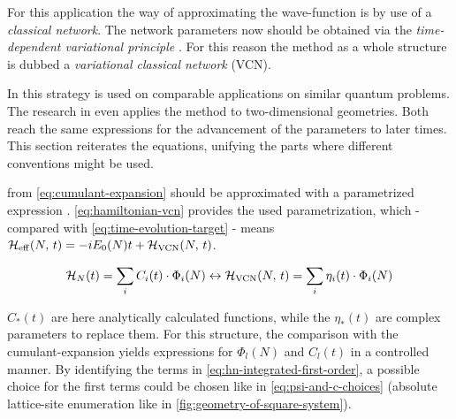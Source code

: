 For this application the way of approximating the wave-function is by use of a \emph{classical network}. 
The network parameters now should be obtained via the \emph{time-dependent variational principle} \cite{originalDerivationTimeDependendVariationalPrinciple}.
For this reason the method as a whole structure is dubbed a \emph{variational classical network} (VCN).

In \cite{variationalClassicalNetworksPaper} this strategy is used on comparable applications on similar quantum problems.
The research in \cite{probabilitySamplingRequirementVCN} even applies the method to two-dimensional geometries.
Both reach the same expressions for the advancement of the parameters to later times.
This section reiterates the equations, unifying the parts where different conventions might be used.

\HNOft from \autoref{eq:cumulant-expansion} should be approximated with a parametrized expression \HvcnOft.
\autoref{eq:hamiltonian-vcn} provides the used parametrization, which - compared with \autoref{eq:time-evolution-target} - means ${\mathcal{H}_\text{eff}}^{}({N},\,t) = -i E_0(N) t + {\mathcal{H}_\text{VCN}}({N},\,t)$.

\begin{equation}
    \label{eq:hamiltonian-vcn}
    \HNOft = \lsum[i] C_i(t) \cdot \Phi_i(N) \leftrightarrow \HvcnOft = \lsum[i] \eta_i(t) \cdot \Phi_i(N)
\end{equation}

$C_\ast(t)$ are here analytically calculated functions, while the $\eta_\ast(t)$ are complex parameters to replace them.
For this structure, the comparison with the cumulant-expansion yields expressions for $\Phi_l(N)$ and $C_l(t)$ in a controlled manner.
By identifying the terms in \autoref{eq:hn-integrated-first-order}, a possible choice for the first terms could be chosen like in \autoref{eq:psi-and-c-choices} (absolute lattice-site enumeration like in \autoref{fig:geometry-of-square-system}). 


